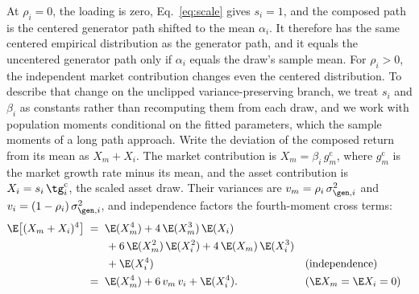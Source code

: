 At $\rho_i = 0$, the loading is zero, Eq.~\eqref{eq:scale} gives
$s_i = 1$, and the composed path is the centered generator path
shifted to the mean $\alpha_i$. It therefore has the same centered
empirical distribution as the generator path, and it equals the
uncentered generator path only if $\alpha_i$ equals the draw's sample
mean. For $\rho_i > 0$, the independent market contribution changes
even the centered distribution. To describe that change on the
unclipped variance-preserving branch, we treat $s_i$ and $\beta_i$ as
constants rather than recomputing them from each draw, and we work
with population moments conditional on the fitted parameters, which
the sample moments of a long path approach. Write the deviation of the
composed return from its mean as $X_m + X_i$. The market contribution
is $X_m = \beta_i\, g_m^{\mathrm c}$, where $g_m^{\mathrm c}$ is the
market growth rate minus its mean, and the asset contribution is
$X_i = s_i\, \tg_i^{\mathrm c}$, the scaled asset draw. Their variances
are $v_m = \rho_i\, \sigma_{\gen,i}^2$ and
$v_i = (1 - \rho_i)\, \sigma_{\gen,i}^2$, and independence factors the fourth-moment cross terms:
\begin{align}
  \E\big[(X_m + X_i)^4\big]
   &\;=\; \E(X_m^4) + 4\,\E(X_m^3)\,\E(X_i)
     \notag \\
   &\qquad + 6\,\E(X_m^2)\,\E(X_i^2)
     + 4\,\E(X_m)\,\E(X_i^3)
     \notag \\
   &\qquad + \E(X_i^4)
     && \text{(independence)} \notag \\
   &\;=\; \E(X_m^4) + 6\, v_m\, v_i + \E(X_i^4).
     && \text{($\E X_m = \E X_i = 0$)}
  \label{eq:supp-comp-fourth}
\end{align}

